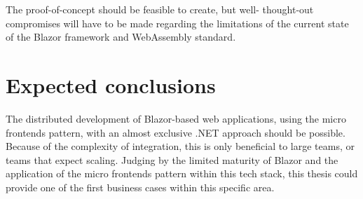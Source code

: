 The proof-of-concept should be feasible to create, but well- thought-out
compromises will have to be made regarding the limitations of the current state
of the Blazor framework and WebAssembly standard.




\section{Expected conclusions}
\label{sec:expected-conclusions}

The distributed development of Blazor-based web applications, using the micro
frontends pattern, with an almost exclusive .NET approach should be possible.
Because of the complexity of integration, this is only beneficial to large
teams, or teams that expect scaling. Judging by the limited maturity of Blazor
and the application of the micro frontends pattern within this tech stack, this
thesis could provide one of the first business cases within this specific area.